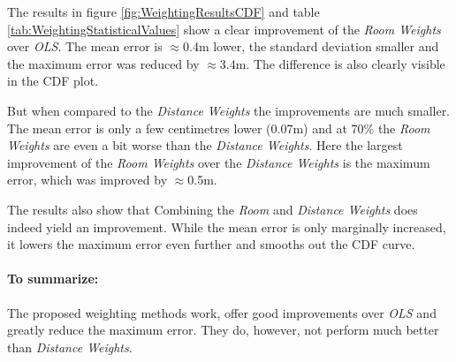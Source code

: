 The results in figure \ref{fig:WeightingResultsCDF} and table \ref{tab:WeightingStatisticalValues} show a clear improvement of the \emph{Room Weights} over \emph{OLS}. The mean error is $\approx$0.4m lower, the standard deviation smaller and the maximum error was reduced by $\approx$3.4m. The difference is also clearly visible in the CDF plot.

But when compared to the \emph{Distance Weights} the improvements are much smaller. The mean error is only a few centimetres lower (0.07m) and at 70\% the \emph{Room Weights} are even a bit worse than the \emph{Distance Weights}. Here the largest improvement of the \emph{Room Weights} over the \emph{Distance Weights} is the maximum error, which was improved by $\approx$0.5m.

The results also show that Combining the \emph{Room} and \emph{Distance Weights} does indeed yield an improvement. While the mean error is only marginally increased, it lowers the maximum error even further and smooths out the CDF curve.

\paragraph{To summarize:} 

The proposed weighting methods work, offer good improvements over \emph{OLS} and greatly reduce the maximum error. They do, however, not perform much better than \emph{Distance Weights}.


